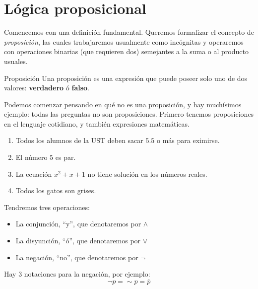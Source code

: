 \documentclass[11pt, twoside]{book}
\begin{document}
\section{Lógica proposicional}
Comencemos con una definición fundamental. Queremos formalizar el concepto de \emph{proposición}, las cuales trabajaremos usualmente como incógnitas y operaremos con operaciones binarias (que requieren dos) semejantes a la suma o al producto usuales.
\begin{definition}{Proposición}
    Una proposición es una expresión que puede poseer solo uno de dos valores: \textbf{verdadero} ó \textbf{falso}.
\end{definition}
Podemos comenzar pensando en qué no es una proposición, y hay muchísimos ejemplo: todas las preguntas no son proposiciones. Primero tenemos proposiciones en el lenguaje cotidiano, y también expresiones matemáticas.
\begin{example}
    \begin{enumerate}
        \item Todos los alumnos de la UST deben sacar \(5.5\) o más para eximirse.
        \item El número \(5\) es par.
        \item La ecuación \(x^2+x+1\) no tiene solución en los números reales.
        \item Todos los gatos son grises.
    \end{enumerate}
\end{example}


Tendremos tres operaciones:
\begin{itemize}[label=\(\bullet\)]
    \item La conjunción, \enquote{y}, que denotaremos por  \(\wedge\)
    \item La disyunción, \enquote{ó}, que denotaremos por \(\vee\)
    \item La negación, \enquote{no}, que denotaremos por \(\neg\)
\end{itemize}
\begin{note}
Hay 3 notaciones para la negación, por ejemplo:
    \[\neg p=\sim p =\overline{p}\]
\end{note}
\end{document}
